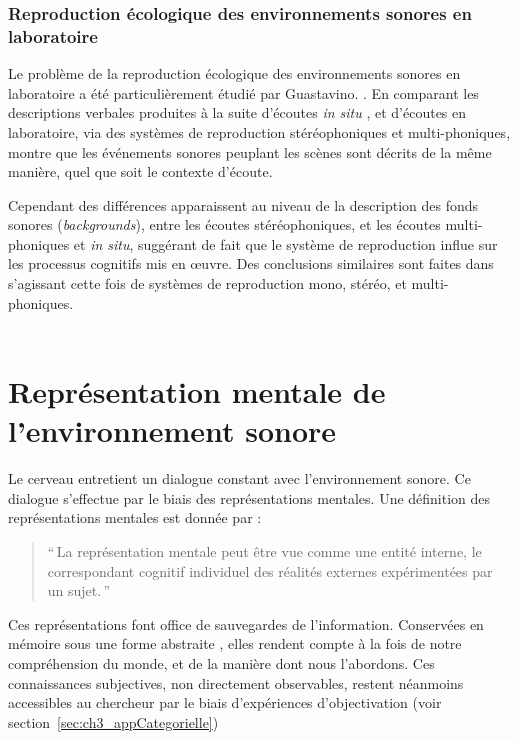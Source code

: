 \subsubsection{Reproduction écologique des environnements sonores en laboratoire}

Le problème de la reproduction écologique des environnements sonores en laboratoire a été particulièrement étudié par Guastavino. \citep{guastavino2003approche,guastavino2004perceptual,guastavino2005ecological}. En comparant les descriptions verbales produites à la suite d'écoutes \emph{in situ} , et d'écoutes en laboratoire, via des systèmes de reproduction stéréophoniques et multi-phoniques, \citep{guastavino2005ecological} montre que les événements sonores peuplant les scènes sont décrits de la même manière, quel que soit le contexte d'écoute.

Cependant des différences apparaissent au niveau de la description des fonds sonores (\emph{backgrounds}), entre les écoutes stéréophoniques, et les écoutes multi-phoniques et \emph{in situ}, suggérant de fait que le système de reproduction influe sur les processus cognitifs mis en œuvre. Des conclusions similaires sont faites dans \citep{guastavino2004perceptual} s'agissant cette fois de systèmes de reproduction mono, stéréo, et multi-phoniques. \\

 \\



\section{Représentation mentale de l'environnement sonore}
\label{sec:ch3_representationMentale}
 
 
Le cerveau entretient un dialogue constant avec l'environnement sonore. Ce dialogue s'effectue par le biais des représentations mentales. Une définition des représentations mentales est donnée par \citep{houde1998vocabulaire}:

\begin{quote}
``\,La représentation mentale peut être vue comme une entité interne, le correspondant cognitif individuel des réalités externes expérimentées par un sujet.\,''
\end{quote}

Ces représentations font office de sauvegardes de l'information. Conservées en mémoire sous une forme abstraite \citep[p. 357]{mcadams1994penser}, elles rendent compte à la fois de notre compréhension du monde, et de la manière dont nous l'abordons. Ces connaissances subjectives, non directement observables, restent néanmoins accessibles au chercheur par le biais d'expériences d'objectivation (voir section~\ref{sec:ch3_appCategorielle})
 
